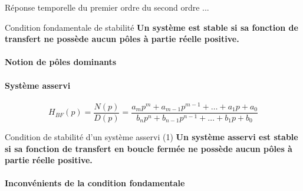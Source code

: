 \acpl
Réponse temporelle du premier ordre du second ordre ...

\begin{criteria}{Condition fondamentale de stabilité}
    \textbf{Un système est stable si sa fonction de transfert ne possède aucun pôles à partie réelle positive.}
\end{criteria}



\paragraph{Notion de pôles dominants}

\paragraph{Système asservi}

\begin{center}
\end{center}

$$
H_{BF}(p)=\dfrac{N(p)}{D(p)}=\dfrac{a_mp^m+a_{m-1}p^{m-1}+\ldots+a_1p+a_0}{b_np^n+b_{n-1}p^{n-1}+\ldots+b_1p+b_0}
$$

\begin{criteria}{Condition de stabilité d'un système asservi (1)}
    \textbf{Un système asservi est stable si sa fonction de transfert en boucle fermée 
    ne possède aucun pôles à partie réelle positive.}
\end{criteria}


\paragraph{Inconvénients de la condition fondamentale}

